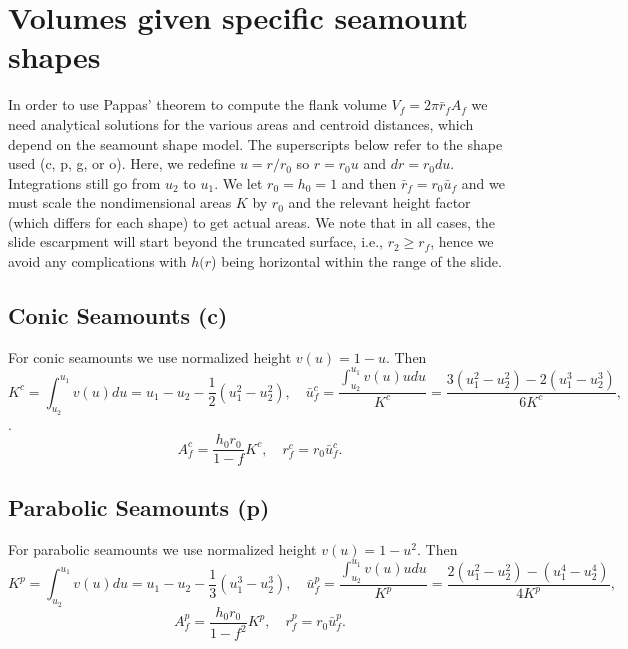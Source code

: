 \documentclass[12pt,letterpaper,margin=0.5in]{report}
\begin{document}
\section{Volumes given specific seamount shapes}

In order to use Pappas' theorem to compute the flank volume $V_f = 2 \pi \bar{r}_f A_f$ we need analytical
solutions for the various areas and centroid distances, which depend on the seamount shape model.  The
superscripts below refer to the shape used (c, p, g, or o). Here,
we redefine $u = r/r_0$ so $r = r_0 u$ and $dr = r_0 du$.  Integrations still go from $u_2$
to $u_1$.  We let $r_0 = h_0 = 1$ and then $\bar{r}_f = r_0 \bar{u}_f$ and we must scale the nondimensional areas $K$
by $r_0$ and the relevant height factor (which differs for each shape) to get actual areas. We note that
in all cases, the slide escarpment will start beyond the truncated surface, i.e., $r_2 \ge r_f$, hence we avoid
any complications with $h(r$) being horizontal within the range of the slide.

\subsection{Conic Seamounts (c)}

For conic seamounts we use normalized height $v(u) = 1 - u$. Then
\begin{equation}
K^c = \int_{u_2}^{u_1} v(u) du = u_1 - u_2 - \frac{1}{2}\left ( u_1^2 - u_2^2 \right ), \quad \bar{u}_f^c = \frac{\int_{u_2}^{u_1} v(u) u du}{K^c} = \frac{3(u_1^2 - u_2^2) - 2 (u_1^3 - u_2^3)}{6K^c},
\end{equation}.
\begin{equation}
A_f^c = \frac{h_0 r_0}{1-f}K^c, \quad r_f^c = r_0\bar{u}_f^c.
\end{equation}

\subsection{Parabolic Seamounts (p)}

For parabolic seamounts we use normalized height $v(u) = 1 - u^2$. Then
\begin{equation}
K^p = \int_{u_2}^{u_1} v(u) du = u_1 - u_2 - \frac{1}{3}\left ( u_1^3 - u_2^3 \right ), \quad \bar{u}_f^p = \frac{\int_{u_2}^{u_1} v(u) u du}{K^p} = \frac{2(u_1^2 - u_2^2) - (u_1^4 - u_2^4)}{4K^p},
\end{equation}
\begin{equation}
A_f^p = \frac{h_0 r_0}{1-f^2}K^p, \quad r_f^p = r_0\bar{u}_f^p.
\end{equation}
\end{document}
